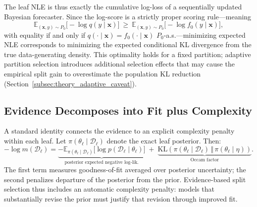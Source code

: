 \documentclass[twoside,11pt]{article}
\begin{document}
The leaf NLE is thus exactly the cumulative log-loss of a sequentially updated Bayesian forecaster. Since the log-score is a strictly proper scoring rule---meaning
\begin{equation}\label{eq:proper_log_score}
\mathbb{E}_{(\mathbf{x},y)\sim P_0}\big[-\log q(y\mid \mathbf{x})\big]
\ \ge\
\mathbb{E}_{(\mathbf{x},y)\sim P_0}\big[-\log f_0(y\mid \mathbf{x})\big],
\end{equation}
with equality if and only if $q(\cdot\mid \mathbf{x})=f_0(\cdot\mid \mathbf{x})$ $P_0$-a.s.---minimizing expected NLE corresponds to minimizing the expected conditional KL divergence from the true data-generating density. This optimality holds for a fixed partition; adaptive partition selection introduces additional selection effects that may cause the empirical split gain to overestimate the population KL reduction (Section~\ref{subsec:theory_adaptive_caveat}).


\subsection{Evidence Decomposes into Fit plus Complexity}\label{subsec:theory_occam}

A standard identity connects the evidence to an explicit complexity penalty within each leaf.
Let $\pi(\theta_\ell\mid \mathcal{D}_\ell)$ denote the exact leaf posterior. Then:
\begin{equation}\label{eq:evidence_decomposition}
-\log m(\mathcal{D}_\ell)
=
\underbrace{-\mathbb{E}_{\pi(\theta_\ell\mid \mathcal{D}_\ell)}
\big[\log p(\mathcal{D}_\ell\mid \theta_\ell)\big]}_{\text{posterior expected negative log-lik.}}
\;+\;
\underbrace{\mathrm{KL}\!\left(\pi(\theta_\ell\mid \mathcal{D}_\ell)\,\Vert\,\pi(\theta_\ell\mid\eta)\right)}_{\text{Occam factor}}.
\end{equation}
The first term measures goodness-of-fit averaged over posterior uncertainty; the second penalizes departure of the posterior from the prior. Evidence-based split selection thus includes an automatic complexity penalty: models that substantially revise the prior must justify that revision through improved fit.
\end{document}
